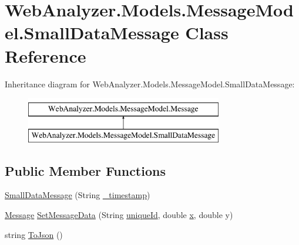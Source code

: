 \hypertarget{class_web_analyzer_1_1_models_1_1_message_model_1_1_small_data_message}{}\section{Web\+Analyzer.\+Models.\+Message\+Model.\+Small\+Data\+Message Class Reference}
\label{class_web_analyzer_1_1_models_1_1_message_model_1_1_small_data_message}
Inheritance diagram for Web\+Analyzer.\+Models.\+Message\+Model.\+Small\+Data\+Message\+:\begin{figure}[H]
\begin{center}
\leavevmode
\includegraphics[height=2.000000cm]{class_web_analyzer_1_1_models_1_1_message_model_1_1_small_data_message}
\end{center}
\end{figure}
\subsection*{Public Member Functions}
\begin{DoxyCompactItemize}
\item 
\hyperlink{class_web_analyzer_1_1_models_1_1_message_model_1_1_small_data_message_a6d3277a92841d1dad66fc9624440bb44}{Small\+Data\+Message} (String \hyperlink{class_web_analyzer_1_1_models_1_1_message_model_1_1_message_ae1e243f35e213e08ec2bdc54f64b0d2e}{\+\_\+timestamp})
\item 
\hyperlink{class_web_analyzer_1_1_models_1_1_message_model_1_1_message}{Message} \hyperlink{class_web_analyzer_1_1_models_1_1_message_model_1_1_small_data_message_a561665d1d14344432438f35ad7ff8291}{Set\+Message\+Data} (String \hyperlink{_u_i_2_h_t_m_l_resources_2js_2lib_2underscore_8min_8js_af690ff5521d79c7128861033ae80ae17}{unique\+Id}, double \hyperlink{_u_i_2_h_t_m_l_resources_2js_2lib_2underscore_8min_8js_a81e910173af87b1161e719a504d52407}{x}, double y)
\item 
string \hyperlink{class_web_analyzer_1_1_models_1_1_message_model_1_1_small_data_message_a3356382b18a26961825c50a7037e826f}{To\+Json} ()
\end{DoxyCompactItemize}
